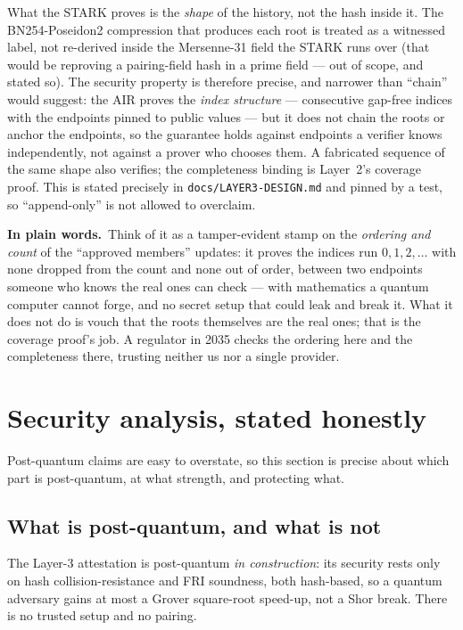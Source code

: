 \documentclass[11pt]{article}
\newcommand{\intuition}[1]{%
  \par\vspace{0.5em}%
  \noindent\colorbox{soft}{\parbox{\dimexpr\linewidth-2\fboxsep}{%
  \small\textbf{\color{klein}In plain words.}\ #1}}%
  \par\vspace{0.5em}%
}
\newcommand{\code}[1]{\texttt{\small #1}}
\begin{document}
What the STARK proves is the \emph{shape} of the history, not the hash inside it.
The BN254-Poseidon2 compression that produces each root is treated as a witnessed
label, not re-derived inside the Mersenne-31 field the STARK runs over (that would
be reproving a pairing-field hash in a prime field --- out of scope, and stated
so). The security property is therefore precise, and narrower than ``chain''
would suggest: the AIR proves the \emph{index structure} --- consecutive gap-free
indices with the endpoints pinned to public values --- but it does not chain the
roots or anchor the endpoints, so the guarantee holds against endpoints a verifier
knows independently, not against a prover who chooses them. A fabricated sequence
of the same shape also verifies; the completeness binding is Layer~2's coverage
proof. This is stated precisely in \code{docs/LAYER3-DESIGN.md} and pinned by a
test, so ``append-only'' is not allowed to overclaim.

\intuition{Think of it as a tamper-evident stamp on the \emph{ordering and count}
of the ``approved members'' updates: it proves the indices run $0,1,2,\dots$ with
none dropped from the count and none out of order, between two endpoints someone
who knows the real ones can check --- with mathematics a quantum computer cannot
forge, and no secret setup that could leak and break it. What it does not do is
vouch that the roots themselves are the real ones; that is the coverage proof's
job. A regulator in 2035 checks the ordering here and the completeness there,
trusting neither us nor a single provider.}

\section{Security analysis, stated honestly}

Post-quantum claims are easy to overstate, so this section is precise about which
part is post-quantum, at what strength, and protecting what.

\subsection{What is post-quantum, and what is not}

The Layer-3 attestation is post-quantum \emph{in construction}: its security
rests only on hash collision-resistance and FRI soundness, both hash-based, so a
quantum adversary gains at most a Grover square-root speed-up, not a Shor break.
There is no trusted setup and no pairing.
\end{document}
